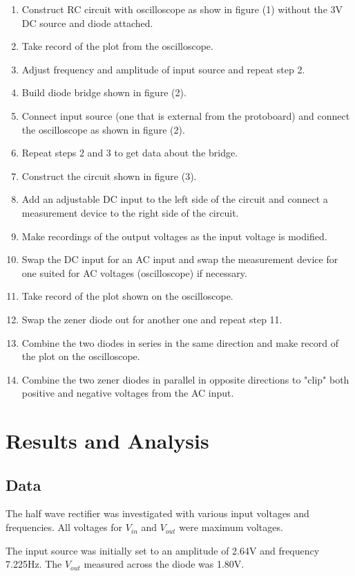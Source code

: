 \documentclass[twocolumn, amsmath]{revtex4}
\begin{document}
\begin{enumerate}
    \item Construct RC circuit with oscilloscope as show in figure (1) without the 3V DC source and diode attached.
    \item Take record of the plot from the oscilloscope.
    \item Adjust frequency and amplitude of input source and repeat step 2.
    \item Build diode bridge shown in figure (2).
    \item Connect input source (one that is external from the protoboard) and connect the oscilloscope as shown in figure (2).
    \item Repeat steps 2 and 3 to get data about the bridge.
    \item Construct the circuit shown in figure (3).
    \item Add an adjustable DC input to the left side of the circuit and connect a measurement device to the right side of the circuit.
    \item Make recordings of the output voltages as the input voltage is modified.
    \item Swap the DC input for an AC input and swap the measurement device for one suited for AC voltages (oscilloscope) if necessary.
    \item Take record of the plot shown on the oscilloscope.
    \item Swap the zener diode out for another one and repeat step 11.
    \item Combine the two diodes in series in the same direction and make record of the plot on the oscilloscope.
    \item Combine the two zener diodes in parallel in opposite directions to "clip" both positive and negative voltages from the AC input.
\end{enumerate}


\section{Results and Analysis}

\subsection{Data}
The half wave rectifier was investigated with various input voltages and frequencies. All voltages for $V_{in}$ and $V_{out}$ were maximum voltages.

The input source was initially set to an amplitude of 2.64V and frequency 7.225Hz. The $V_{out}$ measured across the diode was 1.80V.
\end{document}
